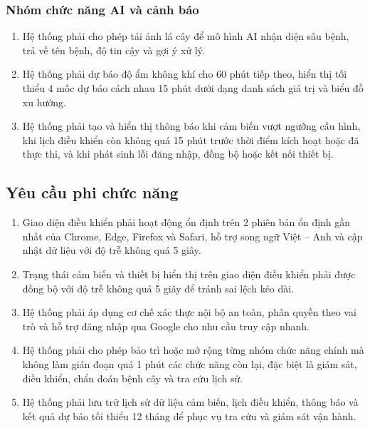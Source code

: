 \subsubsection{Nhóm chức năng AI và cảnh báo}
\begin{enumerate}[label = {\arabic*.}, leftmargin = 1cm]
	\item Hệ thống phải cho phép tải ảnh lá cây để mô hình AI nhận diện sâu bệnh, trả về tên bệnh, độ tin cậy và gợi ý xử lý.
	\item Hệ thống phải dự báo độ ẩm không khí cho 60 phút tiếp theo, hiển thị tối thiểu 4 mốc dự báo cách nhau 15 phút dưới dạng danh sách giá trị và biểu đồ xu hướng.
	\item Hệ thống phải tạo và hiển thị thông báo khi cảm biến vượt ngưỡng cấu hình, khi lịch điều khiển còn không quá 15 phút trước thời điểm kích hoạt hoặc đã thực thi, và khi phát sinh lỗi đăng nhập, đồng bộ hoặc kết nối thiết bị.
\end{enumerate}

\subsection{Yêu cầu phi chức năng}
\begin{enumerate}[label = {\arabic*.}, leftmargin = 1cm]
	\item Giao diện điều khiển phải hoạt động ổn định trên 2 phiên bản ổn định gần nhất của Chrome, Edge, Firefox và Safari, hỗ trợ song ngữ Việt -- Anh và cập nhật dữ liệu với độ trễ không quá 5 giây.
	\item Trạng thái cảm biến và thiết bị hiển thị trên giao diện điều khiển phải được đồng bộ với độ trễ không quá 5 giây để tránh sai lệch kéo dài.
	\item Hệ thống phải áp dụng cơ chế xác thực nội bộ an toàn, phân quyền theo vai trò và hỗ trợ đăng nhập qua Google cho nhu cầu truy cập nhanh.
	\item Hệ thống phải cho phép bảo trì hoặc mở rộng từng nhóm chức năng chính mà không làm gián đoạn quá 1 phút các chức năng còn lại, đặc biệt là giám sát, điều khiển, chẩn đoán bệnh cây và tra cứu lịch sử.
	\item Hệ thống phải lưu trữ lịch sử dữ liệu cảm biến, lịch điều khiển, thông báo và kết quả dự báo tối thiểu 12 tháng để phục vụ tra cứu và giám sát vận hành.
\end{enumerate}